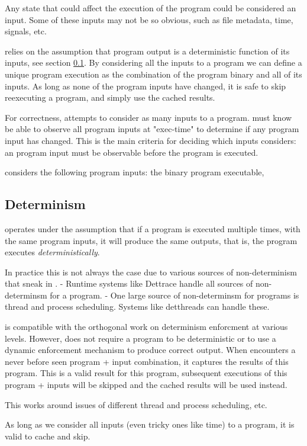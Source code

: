Any state that could affect the execution of the program could be considered an input. Some of these inputs
may not be so obvious, such as file metadata, time, signals, etc.

\pc relies on the assumption that program output is a deterministic function of its inputs, see section \ref{determinism}. By considering all the inputs to a program we can define a unique program execution
as the combination of the program binary and all of its inputs. As long as none of the program inputs have changed, it is safe to skip reexecuting a program, and simply use the cached results.

For correctness, \pc attempts to consider as many inputs to a program. \pc must know be able to observe
all program inputs at "exec-time" to determine if any program input has changed. This is the main criteria for deciding which inputs \pc considers: an program input must be observable before the program is executed. 


\pc considers the following program
inputs: the binary program executable, 

\subsection{Determinism} \label{determinism}
\pc operates under the assumption that if a program is executed multiple times, with the same program
inputs, it will produce the same outputs, that is, the program executes \textit{deterministically}.

In practice this is not always the case due to various sources of non-determinism that sneak in \cite{dettrace}.
- Runtime systems like Dettrace handle all sources of non-determinsm for a program.
- One large source of non-determinsm for programs is thread and process scheduling. Systems like detthreads
  can handle these.

\pc is compatible with the orthogonal work on determinism enforcment at various levels. However,
\pc does not require a program to be deterministic or to use a dynamic enforcement mechanism to
produce correct output. When \pc encounters a never before seen program + input combination, it
captures the results of this program. This is a valid result for this program, subsequent executions of this program + inputs will be skipped and the cached results will be used instead.

This works around issues of different thread and process scheduling, etc.

As long as we consider all inputs (even tricky ones like time) to a program, it is valid to cache and
skip.

